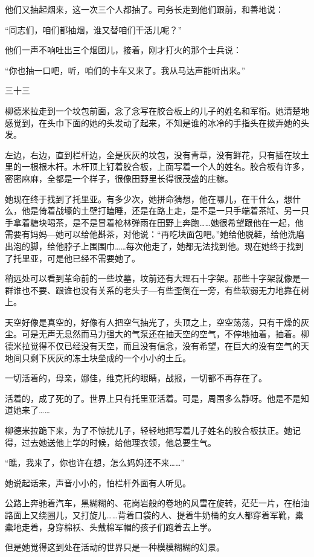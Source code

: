 他们又抽起烟来，这一次三个人都抽了。司务长走到他们跟前，和善地说：

“同志们，咱们都抽烟，谁又替咱们干活儿呢？”

他们一声不响吐出三个烟团儿，接着，刚才打火的那个士兵说：

“你也抽一口吧，听，咱们的卡车又来了。我从马达声能听出来。”

三十三

柳德米拉走到一个坟包前面，念了念写在胶合板上的儿子的姓名和军衔。她清楚地感觉到，在头巾下面的她的头发动了起来，不知是谁的冰冷的手指头在拨弄她的头发。

左边，右边，直到栏杆边，全是灰灰的坟包，没有青草，没有鲜花，只有插在坟土里的一根根木杆。木杆顶上钉着胶合板，上面写着一个人的姓名。胶合板有许多，密密麻麻，全都是一个样子，很像田野里长得很茂盛的庄稼。

她现在终于找到了托里亚。有多少次，她拼命猜想，他在哪儿，在干什么，想什么，他是倚着战壕的土壁打瞌睡，还是在路上走，是不是一只手端着茶缸、另一只手拿着糖块喝茶，是不是冒着枪林弹雨在田野上奔跑……她很希望跟他在一起，他需要有妈妈—她可以给他斟茶，对他说：“再吃块面包吧。”她给他脱鞋，给他洗磨出泡的脚，给他脖子上围围巾……每次他走了，她都无法找到他。现在她终于找到了托里亚，可是他已经不需要她了。

稍远处可以看到革命前的一些坟墓，坟前还有大理石十字架。那些十字架就像是一群谁也不要、跟谁也没有关系的老头子—有些歪倒在一旁，有些软弱无力地靠在树上。

天空好像是真空的，好像有人把空气抽光了，头顶之上，空空荡荡，只有干燥的灰尘。可是无声无息然而马力强大的气泵还在抽天空的空气，不停地抽着，抽着。柳德米拉觉得不仅已经没有天空，而且没有信念，没有希望，在巨大的没有空气的天地间只剩下灰灰的冻土块垒成的一个小小的土丘。

一切活着的，母亲，娜佳，维克托的眼睛，战报，一切都不再存在了。

活着的，成了死的了。世界上只有托里亚活着。可是，周围多么静呀。他是不是知道她来了……

柳德米拉跪下来，为了不惊扰儿子，轻轻地把写着儿子姓名的胶合板扶正。她记得，过去她送他上学的时候，给他理衣领，他总要生气。

“瞧，我来了，你也许在想，怎么妈妈还不来……”

她说起话来，声音小小的，怕栏杆外面有人听见。

公路上奔驰着汽车，黑糊糊的、花岗岩般的卷地的风雪在旋转，茫茫一片，在柏油路面上又绕圈儿，又打旋儿……背着口袋的人、提着牛奶桶的女人都穿着军靴，橐橐地走着，身穿棉袄、头戴棉军帽的孩子们跑着去上学。

但是她觉得这到处在活动的世界只是一种模模糊糊的幻景。

